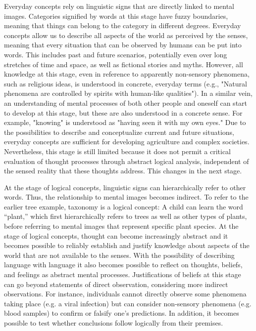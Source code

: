 \documentclass[authordate, reflection]{jote-new-article}
\begin{document}
	







	Everyday concepts rely on linguistic signs that are directly linked to mental images. Categories signified by words at this stage have fuzzy boundaries, meaning that things can belong to the category in different degrees. Everyday concepts allow us to describe all aspects of the world as perceived by the senses, meaning that every situation that can be observed by humans can be put into words. This includes past and future scenarios, potentially even over long stretches of time and space, as well as fictional stories and myths. However, all knowledge at this stage, even in reference to apparently non-sensory phenomena, such as religious ideas, is understood in concrete, everyday terms (e.g., "Natural phenomena are controlled by spirits with human-like qualities"). In a similar vein, an understanding of mental processes of both other people and oneself can start to develop at this stage, but these are also understood in a concrete sense. For example, "knowing" is understood as "having seen it with my own eyes." Due to the possibilities to describe and conceptualize current and future situations, everyday concepts are sufficient for developing agriculture and complex societies. Nevertheless, this stage is still limited because it does not permit a critical evaluation of thought processes through abstract logical analysis, independent of the sensed reality that these thoughts address. This changes in the next stage.



	At the stage of logical concepts, linguistic signs can hierarchically refer to other words. Thus, the relationship to mental images becomes indirect. To refer to the earlier tree example, taxonomy is a logical concept: A child can learn the word “plant,” which first hierarchically refers to trees as well as other types of plants, before referring to mental images that represent specific plant species. At the stage of logical concepts, thought can become increasingly abstract and it becomes possible to reliably establish and justify knowledge about aspects of the world that are not available to the senses. With the possibility of describing language with language it also becomes possible to reflect on thoughts, beliefs, and feelings as abstract mental processes. Justifications of beliefs at this stage can go beyond statements of direct observation, considering more indirect observations. For instance, individuals cannot directly observe some phenomena taking place (e.g. a viral infection) but can consider non-sensory phenomena (e.g. blood samples) to confirm or falsify one's predictions. In addition, it becomes possible to test whether conclusions follow logically from their premises.
\end{document}
